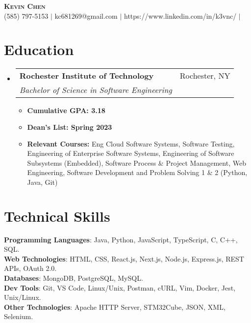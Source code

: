 \documentclass[letterpaper,11pt]{article}
\makeatletter
\newcommand{\resumeItem}[1]{
  \item\small{
    {#1 \vspace{-2pt}}
  }
}
\newcommand{\resumeSubheading}[4]{
  \vspace{-2pt}\item
    \begin{tabular*}{0.97\textwidth}[t]{l@{\extracolsep{\fill}}r}
      \textbf{#1} & #2 \\
      \textit{\small#3} & \textit{\small #4} \\
    \end{tabular*}\vspace{-7pt}
}
\newcommand{\resumeSubHeadingListStart}{\begin{itemize}[leftmargin=0.15in, label={}]}
\newcommand{\resumeSubHeadingListEnd}{\end{itemize}}
\newcommand{\resumeItemListStart}{\begin{itemize}}
\newcommand{\resumeItemListEnd}{\end{itemize}\vspace{-5pt}}
\makeatother
\begin{document}

\begin{center}
    \textbf{\Huge \scshape Kevin Chen} \\ \vspace{1pt}
    \small (585) 797-5153 $|$ kc681269@gmail.com $|$ 
    https://www.linkedin.com/in/k3vnc/ $|$
\end{center}


\section{Education}
  \resumeSubHeadingListStart
    \resumeSubheading
      {Rochester Institute of Technology}{Rochester, NY}
      {Bachelor of Science in Software Engineering}{}
      \resumeItemListStart
        \resumeItem{\textbf{Cumulative GPA: 3.18}}
        \resumeItem{\textbf{Dean's List: Spring 2023}}
        \resumeItem{\textbf{Relevant Courses:} Eng Cloud Software Systems, Software Testing, Engineering of Enterprise Software Systems, Engineering of Software Subsystems (Embedded), Software Process \& Project Management, Web Engineering, Software Development and Problem Solving 1 \& 2 (Python, Java, Git)}
      \resumeItemListEnd
  \resumeSubHeadingListEnd

\section{Technical Skills}
\begin{itemize}[leftmargin=0.15in, label={}]
\small{\item{
\textbf{Programming Languages}{: Java, Python, JavaScript, TypeScript, C, C++, SQL.} \\
\textbf{Web Technologies}{: HTML, CSS, React.js, Next.js, Node.js, Express.js, REST APIs, OAuth 2.0.} \\
\textbf{Databases}{: MongoDB, PostgreSQL, MySQL.} \\
\textbf{Dev Tools}{: Git, VS Code, Linux/Unix, Postman, cURL, Vim, Docker, Jest, Unix/Linux.} \\
\textbf{Other Technologies}{: Apache HTTP Server, STM32Cube, JSON, XML, Selenium.}}}\\
\end{itemize}
\end{document}
